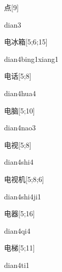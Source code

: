 \begin{verbete}[dian3]{点}[9]
\begin{pronuncia}{dian3}
\end{pronuncia}
\end{verbete}

\begin{verbete}{电冰箱}[5;6;15]
\begin{pronuncia}{dian4bing1xiang1}
\end{pronuncia}
\end{verbete}

\begin{verbete}{电话}[5;8]
\begin{pronuncia}{dian4hua4}
\end{pronuncia}
\end{verbete}

\begin{verbete}{电脑}[5;10]
\begin{pronuncia}{dian4nao3}
\end{pronuncia}
\end{verbete}

\begin{verbete}{电视}[5;8]
\begin{pronuncia}{dian4shi4}
\end{pronuncia}
\end{verbete}

\begin{verbete}{电视机}[5;8;6]
\begin{pronuncia}{dian4shi4ji1}
\end{pronuncia}
\end{verbete}

\begin{verbete}[dian4qi4]{电器}[5;16]
\begin{pronuncia}{dian4qi4}
\end{pronuncia}
\end{verbete}

\begin{verbete}[dian4ti1]{电梯}[5;11]
\begin{pronuncia}{dian4ti1}
\end{pronuncia}
\end{verbete}

